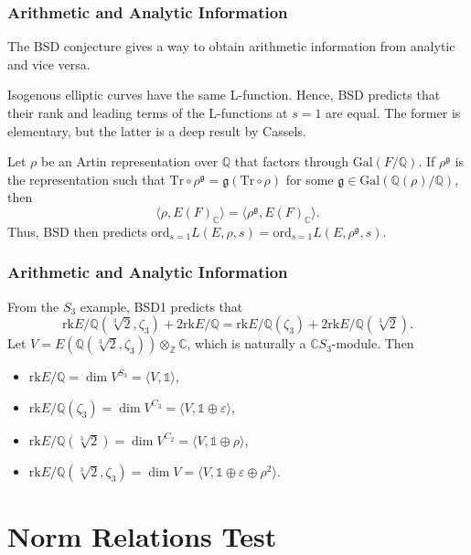 \documentclass{beamer}
\newcommand{\Gal}{\mathrm{Gal}}
\newcommand{\rk}{\mathrm{rk}}
\newcommand{\Tr}{\mathrm{Tr}}
\newcommand{\ord}{\mathrm{ord}}
\newcommand{\CC}{\mathbb{C}}
\newcommand{\QQ}{\mathbb{Q}}
\newcommand{\ZZ}{\mathbb{Z}}
\theoremstyle{plain}
\begin{document}
\begin{frame}
    \frametitle{Arithmetic and Analytic Information}
    The BSD conjecture gives a way to obtain arithmetic information from analytic and vice versa. \pause
    \begin{example}
        Isogenous elliptic curves have the same L-function. \pause Hence, BSD predicts that their rank and leading terms of the L-functions at $s=1$ are equal. \pause The former is elementary, but the latter is a deep result by Cassels.
    \end{example}
    \begin{example}
        Let $\rho$ be an Artin representation over $\QQ$ that factors through $\Gal(F/\QQ)$. \pause If $\rho^\mathfrak{g}$ is the representation such that $\Tr\circ \rho^\mathfrak{g}=\mathfrak{g}(\Tr\circ\rho)$ for some $\mathfrak{g}\in\Gal(\QQ(\rho)/\QQ)$, then $$\langle\rho,E(F)_\CC\rangle=\langle\rho^\mathfrak{g},E(F)_\CC\rangle.$$ \pause
        Thus, BSD then predicts $\ord_{s=1}L(E,\rho,s)=\ord_{s=1}L(E,\rho^\mathfrak{g},s)$.
    \end{example}
\end{frame}

\begin{frame}
    \frametitle{Arithmetic and Analytic Information}
    \begin{example}
        From the $S_3$ example, BSD1 predicts that $$\rk E/\QQ(\sqrt[3]{2},\zeta_3)+2\rk E/\QQ=\rk E/\QQ(\zeta_3)+2\rk E/\QQ(\sqrt[3]{2}).$$ \pause
        Let $V=E(\QQ(\sqrt[3]{2},\zeta_3))\otimes_\ZZ \CC$, which is naturally a $\CC S_3$-module. \pause Then 
        \begin{itemize}
            \item $\rk E/\QQ=\dim V^{S_3}= \langle V,\mathds{1}\rangle$,
            \item $\rk E/\QQ(\zeta_3)=\dim V^{C_3}=\langle V,\mathds{1}\oplus\varepsilon\rangle$,
            \item $\rk E/\QQ(\sqrt[3]{2})=\dim V^{C_2}=\langle V,\mathds{1}\oplus\rho\rangle$,
            \item $\rk E/\QQ(\sqrt[3]{2},\zeta_3)=\dim V=\langle V,\mathds{1}\oplus\varepsilon\oplus\rho^2\rangle$.
        \end{itemize}
    \end{example}

\end{frame}

\section*{Norm Relations Test}
\frame{\sectionpage}
\end{document}

